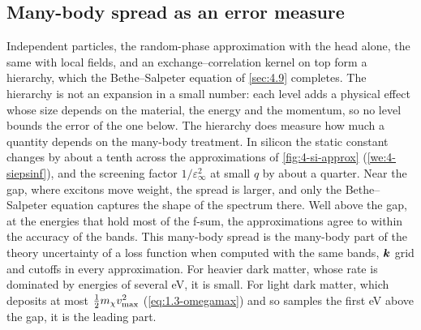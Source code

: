 \subsection{Many-body spread as an error measure}

Independent particles, the random-phase approximation with the head alone, the same with local fields, and an exchange--correlation kernel on top form a hierarchy, which the Bethe--Salpeter equation of \cref{sec:4.9} completes. The hierarchy is not an expansion in a small number: each level adds a physical effect whose size depends on the material, the energy and the momentum, so no level bounds the error of the one below. The hierarchy does measure how much a quantity depends on the many-body treatment. In silicon the static constant changes by about a tenth across the approximations of \cref{fig:4-si-approx} (\cref{we:4-siepsinf}), and the screening factor $1/\varepsilon_\infty^2$ at small $q$ by about a quarter. Near the gap, where excitons move weight, the spread is larger, and only the Bethe--Salpeter equation captures the shape of the spectrum there. Well above the gap, at the energies that hold most of the f-sum, the approximations agree to within the accuracy of the bands. This many-body spread is the many-body part of the theory uncertainty of a loss function when computed with the same bands, $\bm{k}$ grid and cutoffs in every approximation. For heavier dark matter, whose rate is dominated by energies of several eV, it is small. For light dark matter, which deposits at most $\tfrac12m_{\chi} v_{\mathrm{max}}^2$ (\cref{eq:1.3-omegamax}) and so samples the first eV above the gap, it is the leading part.

